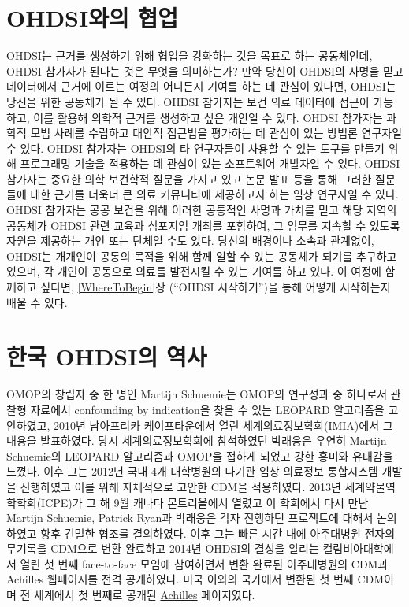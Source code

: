 \documentclass[10.5pt]{book}
\theoremstyle{definition}
\theoremstyle{definition}
\theoremstyle{definition}
\theoremstyle{remark}
\begin{document}
\hypertarget{ohdsi-}{\section{OHDSI와의 협업}\label{ohdsi-}}

OHDSI는 근거를 생성하기 위해 협업을 강화하는 것을 목표로 하는
공동체인데, OHDSI 참가자가 된다는 것은 무엇을 의미하는가? 만약 당신이
OHDSI의 사명을 믿고 데이터에서 근거에 이르는 여정의 어디든지 기여를 하는
데 관심이 있다면, OHDSI는 당신을 위한 공동체가 될 수 있다. OHDSI
참가자는 보건 의료 데이터에 접근이 가능하고, 이를 활용해 의학적 근거를
생성하고 싶은 개인일 수 있다. OHDSI 참가자는 과학적 모범 사례를 수립하고
대안적 접근법을 평가하는 데 관심이 있는 방법론 연구자일 수 있다. OHDSI
참가자는 OHDSI의 타 연구자들이 사용할 수 있는 도구를 만들기 위해
프로그래밍 기술을 적용하는 데 관심이 있는 소프트웨어 개발자일 수 있다.
OHDSI 참가자는 중요한 의학 보건학적 질문을 가지고 있고 논문 발표 등을
통해 그러한 질문들에 대한 근거를 더욱더 큰 의료 커뮤니티에 제공하고자
하는 임상 연구자일 수 있다. OHDSI 참가자는 공공 보건을 위해 이러한
공통적인 사명과 가치를 믿고 해당 지역의 공동체가 OHDSI 관련 교육과
심포지엄 개최를 포함하여, 그 임무를 지속할 수 있도록 자원을 제공하는
개인 또는 단체일 수도 있다. 당신의 배경이나 소속과 관계없이, OHDSI는
개개인이 공통의 목적을 위해 함께 일할 수 있는 공동체가 되기를 추구하고
있으며, 각 개인이 공동으로 의료를 발전시킬 수 있는 기여를 하고 있다. 이
여정에 함께하고 싶다면, \ref{WhereToBegin}장 (``OHDSI 시작하기'')을 통해
어떻게 시작하는지 배울 수 있다.

\section{한국 OHDSI의 역사}\label{-ohdsi-}

OMOP의 창립자 중 한 명인 Martijn Schuemie는 OMOP의 연구성과 중 하나로서
관찰형 자료에서 confounding by indication을 찾을 수 있는 LEOPARD
알고리즘을 고안하였고, 2010년 남아프리카 케이프타운에서 열린
세계의료정보학회(IMIA)에서 그 내용을 발표하였다. 당시 세계의료정보학회에
참석하였던 박래웅은 우연히 Martijn Schuemie의 LEOPARD 알고리즘과 OMOP을
접하게 되었고 강한 흥미와 유대감을 느꼈다. 이후 그는 2012년 국내 4개
대학병원의 다기관 임상 의료정보 통합시스템 개발을 진행하였고 이를 위해
자체적으로 고안한 CDM을 적용하였다. 2013년 세계약물역학학회(ICPE)가 그
해 9월 캐나다 몬트리올에서 열렸고 이 학회에서 다시 만난 Martijn
Schuemie, Patrick Ryan과 박래웅은 각자 진행하던 프로젝트에 대해서
논의하였고 향후 긴밀한 협조를 결의하였다. 이후 그는 빠른 시간 내에
아주대병원 전자의무기록을 CDM으로 변환 완료하고 2014년 OHDSI의 결성을
알리는 컬럼비아대학에서 열린 첫 번째 face-to-face 모임에 참여하면서 변환
완료된 아주대병원의 CDM과 Achilles 웹페이지를 전격 공개하였다. 미국
이외의 국가에서 변환된 첫 번째 CDM이며 전 세계에서 첫 번째로 공개된
\href{http://ami.ajou.ac.kr:8080/}{Achilles} 페이지였다.
\end{document}
